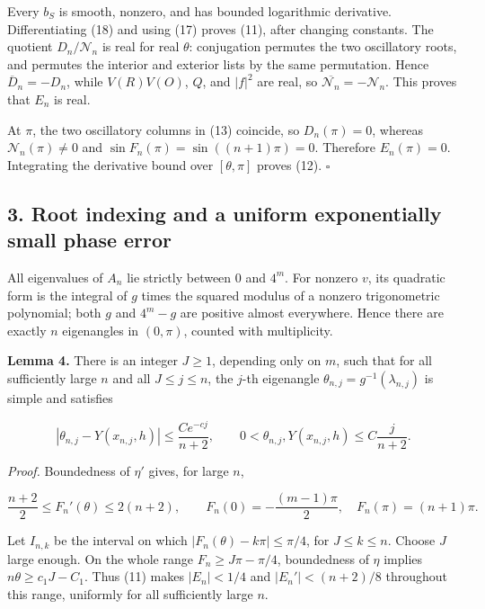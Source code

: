 \documentclass[10pt,a4paper]{article}
\begin{document}
Every \(b_S\) is smooth, nonzero, and has bounded logarithmic derivative. Differentiating (18) and using (17) proves (11), after changing constants. The quotient \(D_n/\mathcal N_n\) is real for real \(\theta\): conjugation permutes the two oscillatory roots, and permutes the interior and exterior lists by the same permutation. Hence \(\overline D_n=-D_n\), while \(V(R)V(O)\), \(Q\), and \(|f|^2\) are real, so \(\overline{\mathcal N_n}=-\mathcal N_n\). This proves that \(E_n\) is real.

At \(\pi\), the two oscillatory columns in (13) coincide, so \(D_n(\pi)=0\), whereas \(\mathcal N_n(\pi)\ne0\) and \(\sin F_n(\pi)=\sin((n+1)\pi)=0\). Therefore \(E_n(\pi)=0\). Integrating the derivative bound over \([\theta,\pi]\) proves (12). \(\square\)

\subsection{3. Root indexing and a uniform exponentially small phase error}\label{root-indexing-and-a-uniform-exponentially-small-phase-error}

All eigenvalues of \(A_n\) lie strictly between 0 and \(4^m\). For nonzero \(v\), its quadratic form is the integral of \(g\) times the squared modulus of a nonzero trigonometric polynomial; both \(g\) and \(4^m-g\) are positive almost everywhere. Hence there are exactly \(n\) eigenangles in \((0,\pi)\), counted with multiplicity.

\textbf{Lemma 4.} There is an integer \(J\ge1\), depending only on \(m\), such that for all sufficiently large \(n\) and all \(J\le j\le n\), the \(j\)-th eigenangle \(\theta_{n,j}=g^{-1}(\lambda_{n,j})\) is simple and satisfies

\nopagebreak[3]
\[
|\theta_{n,j}-Y(x_{n,j},h)|\le \frac{C e^{-cj}}{n+2},\qquad
0<\theta_{n,j},Y(x_{n,j},h)\le C\frac{j}{n+2}.
\tag{19}
\]

\emph{Proof.} Boundedness of \(\eta'\) gives, for large \(n\),

\nopagebreak[3]
\[
\frac{n+2}{2}\le F_n'(\theta)\le2(n+2),\qquad
F_n(0)=-\frac{(m-1)\pi}{2},\quad F_n(\pi)=(n+1)\pi.
\tag{20}
\]

Let \(I_{n,k}\) be the interval on which \(|F_n(\theta)-k\pi|\le\pi/4\), for \(J\le k\le n\). Choose \(J\) large enough. On the whole range \(F_n\ge J\pi-\pi/4\), boundedness of \(\eta\) implies \(n\theta\ge c_1J-C_1\). Thus (11) makes \(|E_n|<1/4\) and \(|E_n'|<(n+2)/8\) throughout this range, uniformly for all sufficiently large \(n\).
\end{document}
